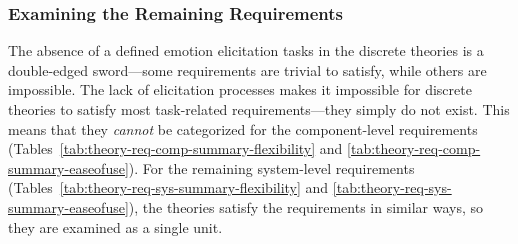\subsubsection{Examining the Remaining Requirements}
The absence of a defined emotion elicitation tasks in the discrete theories is
a double-edged sword---some requirements are trivial to satisfy, while others
are impossible. The lack of elicitation processes makes it impossible for
discrete theories to satisfy most task-related requirements---they simply do
not exist. This means that they \textit{cannot} be categorized for the
component-level requirements
(Tables~\ref{tab:theory-req-comp-summary-flexibility} and
\ref{tab:theory-req-comp-summary-easeofuse}). For the remaining system-level
requirements (Tables~\ref{tab:theory-req-sys-summary-flexibility} and
\ref{tab:theory-req-sys-summary-easeofuse}), the theories satisfy the
requirements in similar ways, so they are examined as a single unit.
